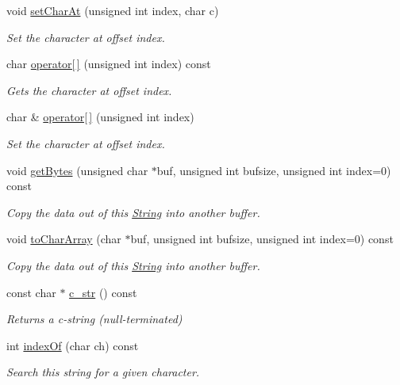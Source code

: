 \begin{DoxyCompactItemize}
void \hyperlink{class_string_a000b7c7b89bbd326a9b966a79bc838e8}{set\+Char\+At} (unsigned int index, char c)
\begin{DoxyCompactList}\small\item\em Set the character at offset index. \end{DoxyCompactList}\item 
char \hyperlink{class_string_a277d6b29f7f152a03c81700b12e43e55}{operator\mbox{[}$\,$\mbox{]}} (unsigned int index) const
\begin{DoxyCompactList}\small\item\em Gets the character at offset index. \end{DoxyCompactList}\item 
char \& \hyperlink{class_string_a0c9922e5854f82cd9952fcb4d6006059}{operator\mbox{[}$\,$\mbox{]}} (unsigned int index)
\begin{DoxyCompactList}\small\item\em Set the character at offset index. \end{DoxyCompactList}\item 
void \hyperlink{class_string_a507250e2de463e60e8df8fb5089f8dae}{get\+Bytes} (unsigned char $\ast$buf, unsigned int bufsize, unsigned int index=0) const
\begin{DoxyCompactList}\small\item\em Copy the data out of this \hyperlink{class_string}{String} into another buffer. \end{DoxyCompactList}\item 
void \hyperlink{class_string_ac090329c1967d6265d63cc0a5b850e23}{to\+Char\+Array} (char $\ast$buf, unsigned int bufsize, unsigned int index=0) const
\begin{DoxyCompactList}\small\item\em Copy the data out of this \hyperlink{class_string}{String} into another buffer. \end{DoxyCompactList}\item 
const char $\ast$ \hyperlink{class_string_a0274f3e61533d15086816fb7f47ccb54}{c\+\_\+str} () const
\begin{DoxyCompactList}\small\item\em Returns a c-\/string (null-\/terminated) \end{DoxyCompactList}\item 
int \hyperlink{class_string_aaf945bda436edaba02fccffbdf3936c1}{index\+Of} (char ch) const
\begin{DoxyCompactList}\small\item\em Search this string for a given character. \end{DoxyCompactList}\item 

\end{DoxyCompactItemize}
